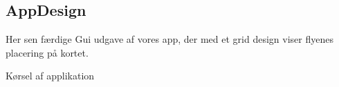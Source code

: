 \newpage
\subsection{AppDesign}
Her sen færdige Gui udgave af vores app, der med et grid design viser flyenes placering på kortet.

 {Kørsel af applikation}